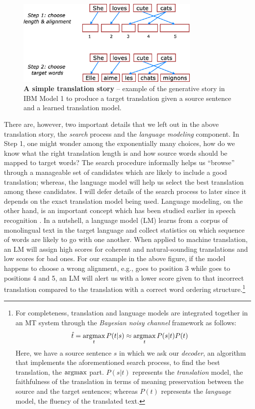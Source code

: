 \begin{figure}[tbh!]
\centering
\includegraphics[width=0.8\textwidth, clip=true, trim= 0 0 0
0]{img/wordmt_algo.eps}
\caption[A simple translation story]{{\bf A simple translation story} -- example of the generative story in
IBM Model 1 to produce a target translation given a source sentence and a
learned translation model.
} 
\label{f:wordmt_algo}
\end{figure}

There are, however, two important details that we left out in the above translation story,
the {\it search} process and the {\it language modeling} component. In Step 1,
one might wonder among the exponentially many choices, how do we know what the
right translation length is and how source words should be mapped to target words? The
search procedure informally helps us ``browse'' through a manageable set of
candidates which are likely to include a good translation; whereas, the language
model will help us select the best translation among these candidates. I will
defer details of the search process to later since it depends on the
exact translation model being used. Language modeling, on the other hand, is an
important concept which has been studied earlier in speech recognition
\cite{katz87}. In a nutshell, a language model (LM)
learns from a corpus of monolingual text in the target language and collect
statistics on which sequence of words are likely to go with one another. When
applied to machine translation, an LM will assign high scores for coherent and
natural-sounding translations and low scores for bad ones.
For our example in the above figure, if the model happens to choose a wrong alignment, e.g.,
 goes to position 3 while  goes to positions 4 and 5, an
LM will alert us with a lower score given to that incorrect translation  compared to the translation  with a correct word ordering structure.\footnote{
For completeness, translation and
language models are integrated together in an MT system through the {\it
Bayesian noisy channel} framework as follows:
\begin{align}
\label{e:noisy}
\hat{t} &= \mathop{\text{argmax}}_t P(t|s) \approx \mathop{\text{argmax}}_t P(s|t) P(t)
\end{align}
Here, we have a source sentence $s$ in which we ask our {\it decoder}, an
algorithm that implements the aforementioned search process, to find the best
translation, the $\mathop{\text{argmax}}$ part. $P(s|t)$ represents the {\it translation} model, the
faithfulness of the translation in terms of meaning preservation between the source and the
target sentences; whereas $P(t)$
represents the {\it language} model, the fluency of the translated text.
}

